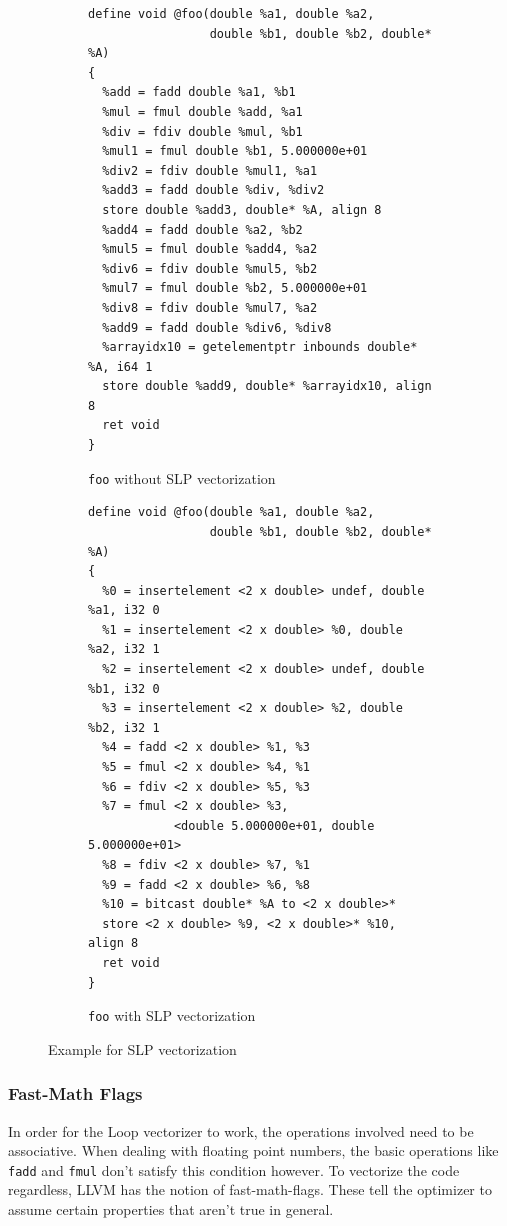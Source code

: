 \documentclass[a4paper,bibliography=totocnumbered,parskip,headsepline]{scrbook}
\begin{document}
\begin{figure}
\begin{subfigure}{\textwidth}
\begin{lstlisting}
define void @foo(double %a1, double %a2,
                 double %b1, double %b2, double* %A)
{
  %add = fadd double %a1, %b1
  %mul = fmul double %add, %a1
  %div = fdiv double %mul, %b1
  %mul1 = fmul double %b1, 5.000000e+01
  %div2 = fdiv double %mul1, %a1
  %add3 = fadd double %div, %div2
  store double %add3, double* %A, align 8
  %add4 = fadd double %a2, %b2
  %mul5 = fmul double %add4, %a2
  %div6 = fdiv double %mul5, %b2
  %mul7 = fmul double %b2, 5.000000e+01
  %div8 = fdiv double %mul7, %a2
  %add9 = fadd double %div6, %div8
  %arrayidx10 = getelementptr inbounds double* %A, i64 1
  store double %add9, double* %arrayidx10, align 8
  ret void
}
\end{lstlisting}
\caption{\lstinline{foo} without SLP vectorization}
\label{fig:slpll1}
\end{subfigure}

\begin{subfigure}{\textwidth}
\begin{lstlisting}
define void @foo(double %a1, double %a2,
                 double %b1, double %b2, double* %A)
{
  %0 = insertelement <2 x double> undef, double %a1, i32 0
  %1 = insertelement <2 x double> %0, double %a2, i32 1
  %2 = insertelement <2 x double> undef, double %b1, i32 0
  %3 = insertelement <2 x double> %2, double %b2, i32 1
  %4 = fadd <2 x double> %1, %3
  %5 = fmul <2 x double> %4, %1
  %6 = fdiv <2 x double> %5, %3
  %7 = fmul <2 x double> %3,
            <double 5.000000e+01, double 5.000000e+01>
  %8 = fdiv <2 x double> %7, %1
  %9 = fadd <2 x double> %6, %8
  %10 = bitcast double* %A to <2 x double>*
  store <2 x double> %9, <2 x double>* %10, align 8
  ret void
}
\end{lstlisting}
\caption{\lstinline{foo} with SLP vectorization}
\label{fig:slpll2}
\end{subfigure}
\caption{Example for SLP vectorization}
\label{fig:slpll}
\end{figure}

\subsubsection{Fast-Math Flags}
In order for the Loop vectorizer to work, the operations involved need to be associative.
When dealing with floating point numbers, the basic operations like \lstinline{fadd} and \lstinline{fmul} don't satisfy this condition however.
To vectorize the code regardless, LLVM has the notion of fast-math-flags\cite{llvmref}.
These tell the optimizer to assume certain properties that aren't true in general.
\end{document}
